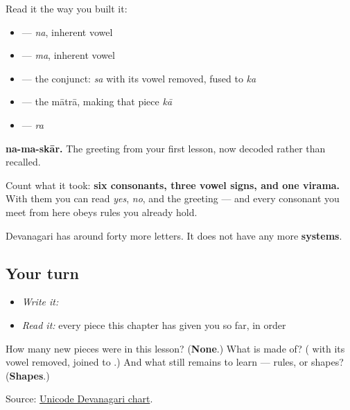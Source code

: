 Read it the way you built it:

\begin{itemize}
\raggedright
  \item \textbf{} — \emph{na}, inherent vowel
  \item \textbf{} — \emph{ma}, inherent vowel
  \item \textbf{} — the conjunct: \emph{sa} with its vowel removed, fused to \emph{ka}
  \item \textbf{} — the mātrā, making that piece \emph{kā}
  \item \textbf{} — \emph{ra}
\end{itemize}

\textbf{na-ma-skār.} The greeting from your first lesson, now decoded rather than recalled.

Count what it took: \textbf{six consonants, three vowel signs, and one virama.} With them you can read \emph{yes}, \emph{no}, and the greeting — and every consonant you meet from here obeys rules you already hold.

Devanagari has around forty more letters. It does not have any more \textbf{systems}.

\subsection*{Your turn}
\begin{itemize}
\raggedright
  \item \emph{Write it:} 
  \item \emph{Read it:} every piece this chapter has given you so far, in order
\end{itemize}

\begin{tcolorbox}[breakable,colback=teal!4,colframe=teal!35!black,title={Before you move on}]
How many new pieces were in this lesson? (\textbf{None}.) What is \textbf{} made of? (\emph{\textbf{}} with its vowel removed, joined to \emph{\textbf{}}.) And what still remains to learn — rules, or shapes? (\textbf{Shapes}.)

Source: \href{https://www.unicode.org/charts/PDF/U0900.pdf}{Unicode Devanagari chart}.
\end{tcolorbox}
